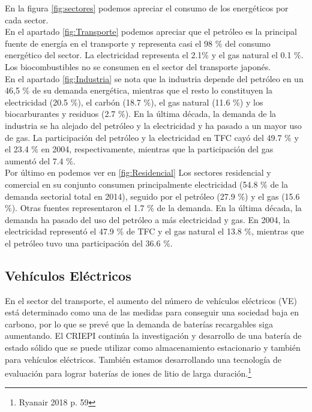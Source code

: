 \documentclass[]{article}
\begin{document}
En la figura \ref{fig:sectores} podemos apreciar el consumo de los energéticos por cada sector.\\

En el apartado \ref{fig:Transporte} podemos apreciar que el petróleo es la principal fuente de energía en el transporte y representa casi el 98 $\%$ del consumo energético del sector. La electricidad representa el 2.1$\%$ y el gas natural el 0.1 $\%$. Los biocombustibles no se consumen en el sector del transporte japonés.\\

En el apartado \ref{fig:Industria} se nota que la industria depende del petróleo en un 46,5 $\%$ de su demanda energética, mientras que el resto lo constituyen la electricidad (20.5 $\%$), el carbón (18.7 $\%$), el gas natural (11.6 $\%$) y los biocarburantes y residuos (2.7 $\%$). En la última década, la demanda de la industria se ha alejado del petróleo y la electricidad y ha pasado a un mayor uso de gas. La participación del petróleo y la electricidad en TFC cayó del 49.7 $\%$ y el 23.4 $\%$ en 2004, respectivamente, mientras que la participación del gas aumentó del 7.4 $\%$.\\


Por último en podemos ver en \ref {fig:Residencial} Los sectores residencial y comercial en su conjunto consumen principalmente electricidad (54.8 $\%$ de la demanda sectorial total en 2014), seguido por el petróleo (27.9 $\%$) y el gas (15.6 $\%$). Otras fuentes representaron el 1.7 $\%$ de la demanda. En la última década, la demanda ha pasado del uso del petróleo a más electricidad y gas. En 2004, la electricidad representó el 47.9 $\%$ de TFC y el gas natural el 13.8 $\%$, mientras que el petróleo tuvo una participación del 36.6 $\%$.\\


\subsection{Vehículos Eléctricos}

En el sector del transporte, el aumento del número de vehículos eléctricos (VE) está determinado como una de las medidas para conseguir una sociedad baja en carbono, por lo que se prevé que la demanda de baterías recargables siga aumentando. El CRIEPI continúa la investigación y desarrollo de una batería de estado sólido que se puede utilizar como almacenamiento estacionario y también para vehículos eléctricos. También estamos desarrollando una tecnología de evaluación para lograr baterías de iones de litio de larga duración.\citep{Ryanair 2018}\footnote{Ryanair 2018 p. 59}\\
\end{document}
